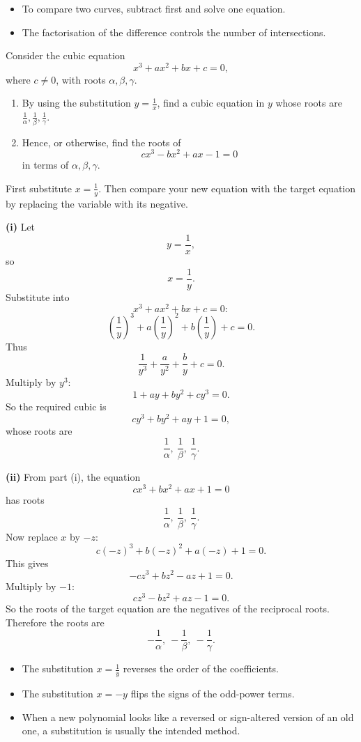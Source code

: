 \begin{takeaways}
\begin{itemize}[leftmargin=*]
\item To compare two curves, subtract first and solve one equation.
\item The factorisation of the difference controls the number of intersections.
\end{itemize}
\end{takeaways}

\begin{problem}
Consider the cubic equation
\[
x^3+ax^2+bx+c=0,
\]
where $c\ne0$, with roots $\alpha,\beta,\gamma$.
\begin{enumerate}[label=(\roman*)]
\item By using the substitution $y=\frac{1}{x}$, find a cubic equation in $y$ whose roots are $\frac1\alpha,\frac1\beta,\frac1\gamma$.
\item Hence, or otherwise, find the roots of
\[
cx^3-bx^2+ax-1=0
\]
in terms of $\alpha,\beta,\gamma$.
\end{enumerate}
\end{problem}

\begin{hintbox}
First substitute $x=\frac1y$. Then compare your new equation with the target equation by replacing the variable with its negative.
\end{hintbox}

\begin{solution}
\textbf{(i)} Let
\[
y=\frac1x,
\]
so
\[
x=\frac1y.
\]
Substitute into
\[
x^3+ax^2+bx+c=0:
\]
\[
\left(\frac1y\right)^3+a\left(\frac1y\right)^2+b\left(\frac1y\right)+c=0.
\]
Thus
\[
\frac1{y^3}+\frac{a}{y^2}+\frac{b}{y}+c=0.
\]
Multiply by $y^3$:
\[
1+ay+by^2+cy^3=0.
\]
So the required cubic is
\[
\boxed{cy^3+by^2+ay+1=0,}
\]
whose roots are
\[
\boxed{\frac1\alpha,\ \frac1\beta,\ \frac1\gamma.}
\]

\textbf{(ii)} From part (i), the equation
\[
cx^3+bx^2+ax+1=0
\]
has roots
\[
\frac1\alpha,\ \frac1\beta,\ \frac1\gamma.
\]
Now replace $x$ by $-z$:
\[
c(-z)^3+b(-z)^2+a(-z)+1=0.
\]
This gives
\[
-cz^3+bz^2-az+1=0.
\]
Multiply by $-1$:
\[
cz^3-bz^2+az-1=0.
\]
So the roots of the target equation are the negatives of the reciprocal roots. Therefore the roots are
\[
\boxed{-\frac1\alpha,\ -\frac1\beta,\ -\frac1\gamma.}
\]
\end{solution}

\begin{takeaways}
\begin{itemize}[leftmargin=*]
\item The substitution $x=\frac1y$ reverses the order of the coefficients.
\item The substitution $x=-y$ flips the signs of the odd-power terms.
\item When a new polynomial looks like a reversed or sign-altered version of an old one, a substitution is usually the intended method.
\end{itemize}
\end{takeaways}

